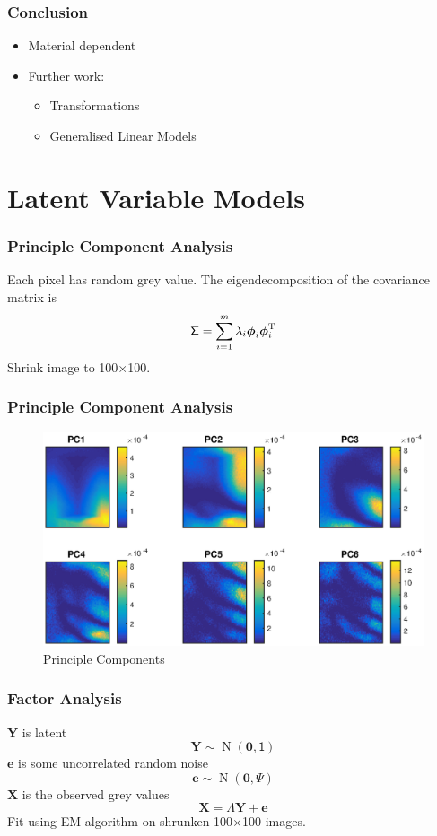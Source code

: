 \documentclass{beamer}
\DeclareMathOperator{\normal}{N}
\newcommand{\T}{^\textup{T}}
\newcommand{\vect}[1]{\mathbf{#1}}
\newcommand{\vectGreek}[1]{\boldsymbol{#1}}
\newcommand{\matr}[1]{\mathsf{#1}}
\begin{document}
\begin{frame}
\frametitle{Conclusion}
\begin{itemize}
	\item Material dependent
	\item Further work:
		\begin{itemize}
			\item Transformations
			\item Generalised Linear Models
		\end{itemize}
\end{itemize}
\end{frame}


\section{Latent Variable Models}

\begin{frame}
\frametitle{Principle Component Analysis}
Each pixel has random grey value. The eigendecomposition of the covariance matrix is
\begin{equation}
\matr{\Sigma} = \sum_{i=1}^{m} \lambda_i \vectGreek{\phi}_i \vectGreek{\phi}_i\T
\end{equation}
Shrink image to 100$\times$100.
\end{frame}

\begin{frame}
\frametitle{Principle Component Analysis}
\begin{figure}
	\includegraphics[width=\textwidth]{figures/initial_PCvariance.eps}
	\caption{Principle Components}
\end{figure}
\end{frame}

\begin{frame}
\frametitle{Factor Analysis}
$\vect{Y}$ is latent
\begin{equation}
\vect{Y}\sim\normal\left(\vect{0},\matr{1}\right)
\end{equation}
\pause
$\vect{e}$ is some uncorrelated random noise
\begin{equation}
\vect{e}\sim\normal\left(\vect{0},\matr{\Psi}\right)
\end{equation}
\pause
$\vect{X}$ is the observed grey values
\begin{equation}
\vect{X}=\matr{\Lambda}\vect{Y}+\vect{e}
\end{equation}
\pause
Fit using EM algorithm on shrunken 100$\times$100 images.
\end{frame}
\end{document}
